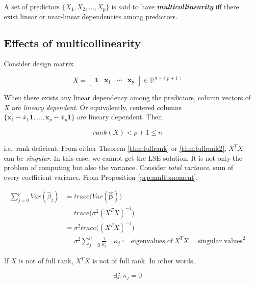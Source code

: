 \documentclass[]{book}
\theoremstyle{definition}
\theoremstyle{definition}
\theoremstyle{definition}
\theoremstyle{remark}
\let\BeginKnitrBlock\begin \let\EndKnitrBlock\end
\begin{document}
\BeginKnitrBlock{definition}[Multicollinearity]
\protect\hypertarget{def:colldef}{}{\label{def:colldef} {} }A set of predictors \(\{ X_1, X_2, \ldots, X_p \}\) is said to have \textbf{\textit{multicollinearity}} iff there exist linear or near-linear dependencies among predictors.
\EndKnitrBlock{definition}

\hypertarget{effects-of-multicollinearity}{%
\subsection{Effects of multicollinearity}\label{effects-of-multicollinearity}}

Consider design matrix

\[X = \begin{bmatrix} \mathbf{1} & \mathbf{x}_1 & \cdots & \mathbf{x}_p \end{bmatrix} \in \mathbb{R}^{n \times (p + 1)}\]

When there exists any linear dependency among the predictors, column vectors of \(X\) are \emph{lineary dependent}. Or equivalently, centered columns \(\{ \mathbf{x}_1 - \overline{x}_1 \mathbf{1}, \ldots, \mathbf{x}_p - \overline{x}_p \mathbf{1} \}\) are lineary dependent. Then

\[rank(X) < p + 1 \le n\]

i.e.~rank deficient. From either Theorem \ref{thm:fullrank} or \ref{thm:fullrank2}, \(X^TX\) can be \emph{singular}. In this case, we cannot get the LSE solution. It is not only the problem of computing but also the variance. Consider \emph{total variance}, sum of every coefficient variance. From Proposition \ref{prp:multbmoment},

\begin{equation*}
  \begin{split}
    \sum_{j = 0}^p Var(\hat\beta_j) & = trace \Big( Var(\boldsymbol{\hat\beta}) \Big) \\
    & = trace \Big( \sigma^2(X^TX)^{-1} \Big) \\
    & = \sigma^2 trace \Big( (X^TX)^{-1} \Big) \\
    & = \sigma^2 \sum_{j = 0}^p \frac{1}{\kappa_j} \quad \kappa_j := \text{eigenvalues of}\: X^TX = \text{singular values}^2
  \end{split}
\end{equation*}

If \(X\) is not of full rank, \(X^T X\) is not of full rank. In other words,

\[\exists j : \kappa_j = 0\]
\end{document}

